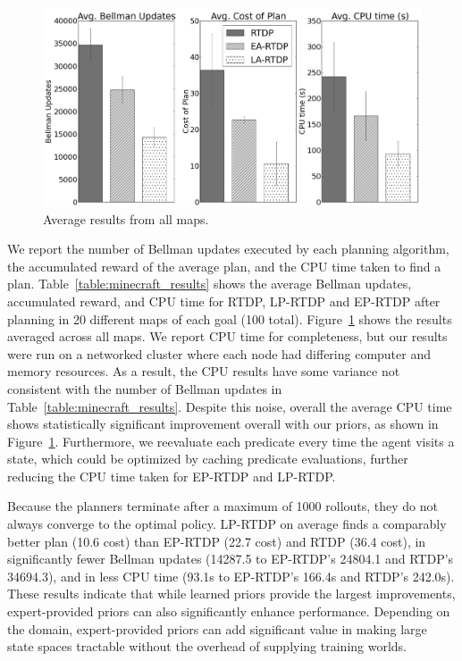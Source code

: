 \documentclass[11pt]{article}
\begin{document}
\begin{figure}[t]
\centering
\includegraphics[width=1\linewidth]{figures/average_results_cropped.png}%
\caption{Average results from all maps.}
\label{fig:average_results}
\end{figure}

We report the number of Bellman updates executed by each planning
algorithm, the accumulated reward of the average plan, and the CPU
time taken to find a plan. Table~\ref{table:minecraft_results} shows
the average Bellman updates, accumulated reward, and CPU time for
RTDP, LP-RTDP and EP-RTDP after planning in 20 different maps of each
goal (100 total). Figure~\ref{fig:average_results} shows the
results averaged across all maps.  We report CPU time for
completeness, but our results were run on a networked cluster where
each node had differing computer and memory resources. As a result,
the CPU results have some variance not consistent with the number of
Bellman updates in Table~\ref{table:minecraft_results}.  Despite this
noise, overall the average CPU time shows statistically significant
improvement overall with our priors, as shown in
Figure~\ref{fig:average_results}. Furthermore, we reevaluate each
predicate every time the agent visits a state, which could be optimized by caching predicate evaluations, further
reducing the CPU time taken for EP-RTDP and LP-RTDP.

Because the planners terminate after a maximum of 1000
rollouts, they do not always converge to the optimal policy. LP-RTDP on
average finds a comparably better plan (10.6 cost) than EP-RTDP (22.7
cost) and RTDP (36.4 cost), in significantly fewer
Bellman updates (14287.5 to EP-RTDP's 24804.1 and RTDP's 34694.3), and in
less CPU time (93.1s to EP-RTDP's 166.4s and RTDP's 242.0s).  These
results indicate that while learned priors provide the largest
improvements, expert-provided priors can also significantly
enhance performance. Depending on the domain, expert-provided priors can add
significant value in making large state spaces tractable without the
overhead of supplying training worlds.
\end{document}
